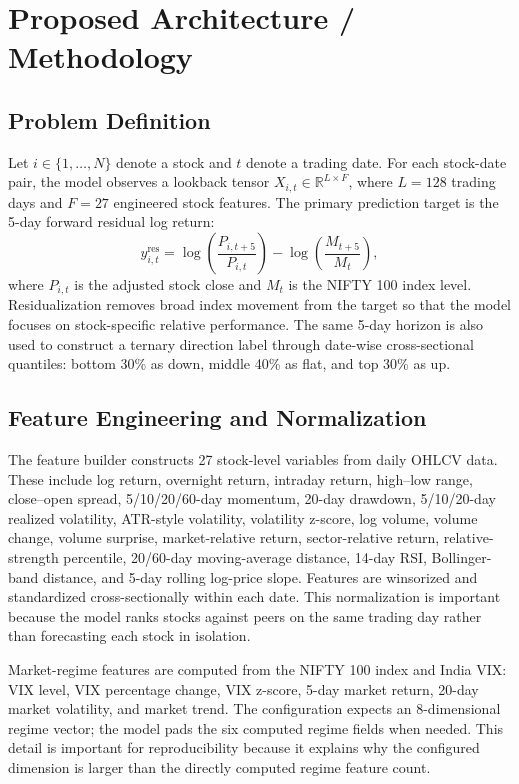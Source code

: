\documentclass[conference]{IEEEtran}
\begin{document}
\section{Proposed Architecture / Methodology}
\subsection{Problem Definition}
Let $i \in \{1,\ldots,N\}$ denote a stock and $t$ denote a trading date. For each stock-date pair, the model observes a lookback tensor $X_{i,t} \in \mathbb{R}^{L \times F}$, where $L=128$ trading days and $F=27$ engineered stock features. The primary prediction target is the 5-day forward residual log return:
\begin{equation}
y^{\text{res}}_{i,t}=\log\left(\frac{P_{i,t+5}}{P_{i,t}}\right)-\log\left(\frac{M_{t+5}}{M_t}\right),
\end{equation}
where $P_{i,t}$ is the adjusted stock close and $M_t$ is the NIFTY 100 index level. Residualization removes broad index movement from the target so that the model focuses on stock-specific relative performance. The same 5-day horizon is also used to construct a ternary direction label through date-wise cross-sectional quantiles: bottom 30\% as down, middle 40\% as flat, and top 30\% as up.

\subsection{Feature Engineering and Normalization}
The feature builder constructs 27 stock-level variables from daily OHLCV data. These include log return, overnight return, intraday return, high--low range, close--open spread, 5/10/20/60-day momentum, 20-day drawdown, 5/10/20-day realized volatility, ATR-style volatility, volatility z-score, log volume, volume change, volume surprise, market-relative return, sector-relative return, relative-strength percentile, 20/60-day moving-average distance, 14-day RSI, Bollinger-band distance, and 5-day rolling log-price slope. Features are winsorized and standardized cross-sectionally within each date. This normalization is important because the model ranks stocks against peers on the same trading day rather than forecasting each stock in isolation.

Market-regime features are computed from the NIFTY 100 index and India VIX: VIX level, VIX percentage change, VIX z-score, 5-day market return, 20-day market volatility, and market trend. The configuration expects an 8-dimensional regime vector; the model pads the six computed regime fields when needed. This detail is important for reproducibility because it explains why the configured dimension is larger than the directly computed regime feature count.
\end{document}
